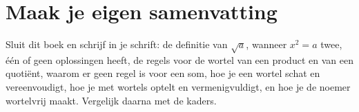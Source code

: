 
\begin{oefeningen}







\end{oefeningen}


\ifzelfstudie
\section*{Maak je eigen samenvatting}
Sluit dit boek en schrijf in je schrift: de definitie van $\sqrt a$, wanneer $x^2 = a$ twee, één of geen oplossingen heeft, de regels voor de wortel van een product en van een quotiënt, waarom er geen regel is voor een som, hoe je een wortel schat en vereenvoudigt, hoe je met wortels optelt en vermenigvuldigt, en hoe je de noemer wortelvrij maakt. Vergelijk daarna met de kaders.
\fi
